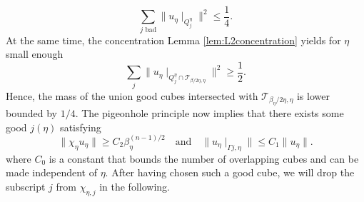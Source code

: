 \documentclass[a4paper,reqno]{amsart}
\numberwithin{equation}{section}
\numberwithin{equation}{section}		%
\numberwithin{figure}{section}			%
\numberwithin{table}{section}				%
\theoremstyle{definition}
\newcommand{\<}{\ensuremath \leq}
\renewcommand{\>}{\ensuremath \geq}
\begin{document}
\begin{equation}
    \sum_{j \text{ bad}} \lVert u_\eta \mid_{Q_j^\eta}\rVert^2 \leq \frac{1}{4}.
\end{equation}
At the same time, the concentration Lemma \ref{lem:L2concentration} yields for $\eta$ small enough
\begin{equation}
    \sum_j\lVert u_\eta \mid_{Q_j^\eta\cap\mathcal{T}_{\beta/2\eta,\eta}}\rVert^2\geq\frac{1}{2}.
\end{equation}
Hence, the mass of the union good cubes intersected with $\mathcal{T}_{\beta_\eta/2\eta,\eta}$ is lower bounded by $1/4$. The pigeonhole principle now implies that there exists some good $j(\eta)$ satisfying
\begin{equation}\label{eq: NiceCube}
    \lVert \chi_\eta u_\eta \rVert\geq C_2\beta_{\eta}^{(n-1)/2}\quad\text{and}\quad\lVert  u_\eta \mid_{\Gamma{j,\eta}}\rVert\leq C_1\lVert u_\eta \rVert.
\end{equation}
where $C_0$ is a constant that bounds the number of overlapping cubes and can be made independent of $\eta$. After having chosen such a good cube, we will drop the subscript $j$ from $\chi_{\eta,j}$ in the following.
\end{document}
